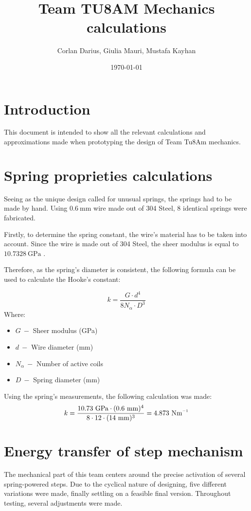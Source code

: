 \documentclass[a4paper]{article}
\title{Team TU8AM Mechanics calculations}
\author{Corlan Darius, Giulia Mauri, Mustafa Kayhan}
\date{\today}
\newcommand{\inv}{^{\raisebox{.2ex}{$\scriptscriptstyle-1$}}}
\newcommand{\unit}[1]{~\mathrm{#1}}
\begin{document}
\maketitle
\section{Introduction}
This document is intended to show all the relevant calculations and
approximations made when prototyping the design of Team Tu8Am mechanics.
\section{Spring proprieties calculations}
Seeing as the unique design called for unusual springs, the springs had to be
made by hand. Using $0.6\unit{mm}$ wire made out of 304 Steel, 8 identical
springs were fabricated.

Firstly, to determine the spring constant, the wire's material has to be taken
into account. Since the wire is made out of 304 Steel, the sheer modulus is
equal to $10.7328\unit{GPa}$ \cite{noauthor_properties_nodate}.

Therefore, as the spring's diameter is consistent, the following formula can be
used to calculate the Hooke's constant\cite{noauthor_compression_nodate}:


\begin{equation}
    k = \frac{G\cdot d^4}{8 N_{\alpha} \cdot D^3}
\end{equation}
Where: 
\begin{itemize}
    \item $G ~-$ Sheer modulus (GPa)
    \item $d ~-$ Wire diameter (mm)
    \item $N_{\alpha} ~-$ Number of active coils 
    \item $D ~-$ Spring diameter (mm)
\end{itemize}

Using the spring's measurements, the following calculation was made:
\[ k = \frac{10.73\unit{GPa} \cdot (0.6\unit{mm}) ^ 4} {8\cdot 12 \cdot
(14\unit{mm})^3} = 4.873\unit{N m\inv}\]

\section{Energy transfer of step mechanism}
The mechanical part of this team centers around the precise activation of
several spring-powered steps. Due to the cyclical nature of designing, five
different variations were made, finally settling on a feasible final version.
Throughout testing, several adjustments were made. 
\end{document}
